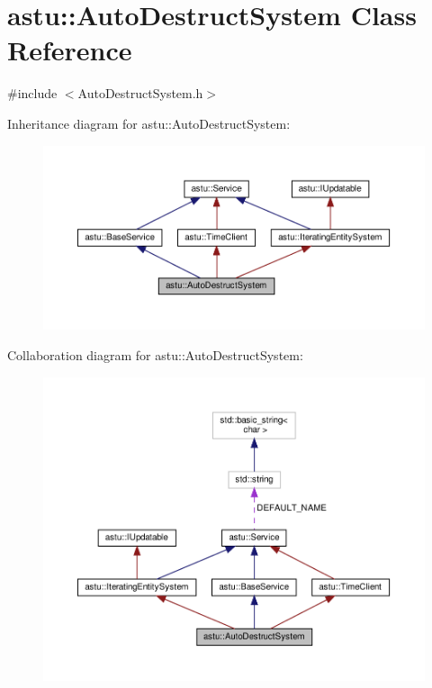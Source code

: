 \hypertarget{classastu_1_1AutoDestructSystem}{}\section{astu\+:\+:Auto\+Destruct\+System Class Reference}
\label{classastu_1_1AutoDestructSystem}


{\ttfamily \#include $<$Auto\+Destruct\+System.\+h$>$}



Inheritance diagram for astu\+:\+:Auto\+Destruct\+System\+:
\nopagebreak
\begin{figure}[H]
\begin{center}
\leavevmode
\includegraphics[width=350pt]{classastu_1_1AutoDestructSystem__inherit__graph}
\end{center}
\end{figure}


Collaboration diagram for astu\+:\+:Auto\+Destruct\+System\+:
\nopagebreak
\begin{figure}[H]
\begin{center}
\leavevmode
\includegraphics[width=350pt]{classastu_1_1AutoDestructSystem__coll__graph}
\end{center}
\end{figure}
